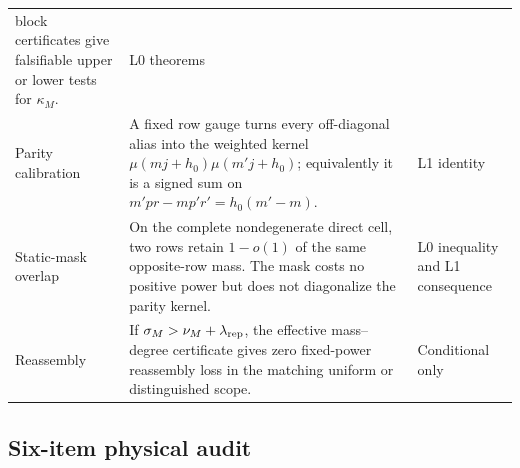 \begin{center}
\begin{tabular}{>{\raggedright\arraybackslash}p{}
                >{\raggedright\arraybackslash}p{}
                >{\raggedright\arraybackslash}p{}}
  block certificates give falsifiable upper or lower tests for
  \(\kappa_M\).
& L0 theorems\\
\addlinespace
Parity calibration
& A fixed row gauge turns every off-diagonal alias into the weighted
  kernel
  \(\mu(mj+h_0)\mu(m'j+h_0)\); equivalently it is a signed sum on
  \(m'pr-mp'r'=h_0(m'-m)\).
& L1 identity\\
\addlinespace
Static-mask overlap
& On the complete nondegenerate direct cell, two rows retain
  \(1-o(1)\) of the same opposite-row mass.  The mask costs no positive
  power but does not diagonalize the parity kernel.
& L0 inequality and L1 consequence\\
\addlinespace
Reassembly
& If
  \(\sigma_M>\nu_M+\lambda_{\rm rep}\), the effective mass--degree
  certificate gives zero fixed-power reassembly loss in the matching
  uniform or distinguished scope.
& Conditional only\\
\bottomrule
\end{tabular}
\end{center}

\subsection{Six-item physical audit}

